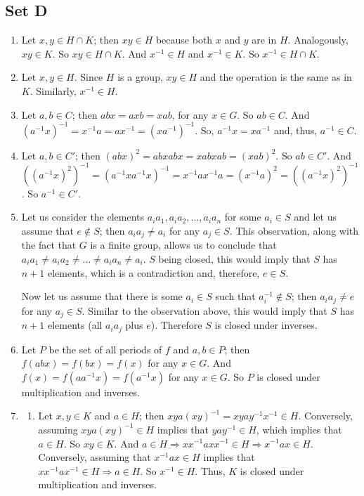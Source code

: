 \documentclass{article}
\begin{document}
\subsection{Set D}
\begin{enumerate}
    \item Let $x, y \in H \cap K$; then $xy \in H$ because both $x$ and $y$ are in $H$. Analogously, $xy \in K$. So $xy \in H \cap K$. And $x^{-1} \in H$ and $x^{-1} \in K$. So $x^{-1} \in H \cap K$.
    
    \item Let $x, y \in H$. Since $H$ is a group, $xy \in H$ and the operation is the same as in $K$. Similarly, $x^{-1} \in H$.
    
    \item Let $a, b \in C$; then $abx = axb = xab$, for any $x \in G$. So $ab \in C$. And $(a^{-1}x)^{-1} = x^{-1}a = ax^{-1} = (xa^{-1})^{-1}$. So, $a^{-1}x = xa^{-1}$ and, thus, $a^{-1} \in C$.
    
    \item Let $a, b \in C'$; then $(abx)^2 = abxabx = xabxab = (xab)^2$. So $ab \in C'$. And $((a^{-1}x)^2)^{-1} = (a^{-1}xa^{-1}x)^{-1} = x^{-1}ax^{-1}a = (x^{-1}a)^2 = ((a^{-1}x)^2)^{-1}$. So $a^{-1} \in C'$.
    
    \item Let us consider the elements $a_ia_1, a_ia_2, \ldots, a_ia_n$ for some $a_i \in S$ and let us assume that $e \notin S$; then $a_ia_j \ne a_i$ for any $a_j \in S$. This observation, along with the fact that $G$ is a finite group, allows us to conclude that $a_ia_1 \ne a_ia_2 \ne \ldots \ne a_ia_n \ne a_i$. $S$ being closed, this would imply that $S$ has $n + 1$ elements, which is a contradiction and, therefore, $e \in S$.

    Now let us assume that there is some $a_i \in S$ such that $a_i^{-1} \notin S$; then $a_ia_j \ne e$ for any $a_j \in S$. Similar to the observation above, this would imply that $S$ has $n + 1$ elements (all $a_ia_j$ plus $e$). Therefore $S$ is closed under inverses.     
    
    \item Let $P$ be the set of all periods of $f$ and $a, b \in P$; then $f(abx) = f(bx) = f(x)$ for any $x \in G$.
    And $f(x) = f(aa^{-1}x) = f(a^{-1}x)$ for any $x \in G$. So $P$ is closed under multiplication and inverses.
    
    \item
        \begin{enumerate}[label=(\alph*)]
            \item Let $x, y \in K$ and $a \in H$; then $xya(xy)^{-1} = xyay^{-1}x^{-1} \in H$. Conversely, assuming $xya(xy)^{-1} \in H$ implies that $yay^{-1} \in H$, which implies that $a \in H$. So $xy \in K$. And $a \in H \Rightarrow xx^{-1}axx^{-1} \in H \Rightarrow x^{-1}ax \in H$. Conversely, assuming that $x^{-1}ax \in H$ implies that $xx^{-1}ax^{-1} \in H \Rightarrow a \in H$. So $x^{-1} \in H$. Thus, $K$ is closed under multiplication and inverses.
            

\end{enumerate}
\end{enumerate}
\end{document}
